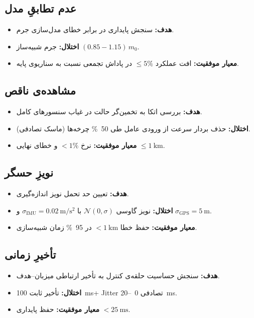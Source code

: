 	\subsection{
		عدم تطابقِ مدل}\label{subsec:scn_mismatch}
	\begin{itemize}
		\item \textbf{هدف:} سنجش پایداری در برابر خطای مدل‌سازی جرم.
		\item \textbf{اختلال:} جرم شبیه‌ساز $(0.85\!-\!1.15)\,m_0$.
		\item \textbf{معیار موفقیت:} افت عملکرد $\le5\%$ در پاداش تجمعی نسبت به سناریوی پایه.
	\end{itemize}
	
	\subsection{
		مشاهده‌ی ناقص}\label{subsec:scn_partial}
	\begin{itemize}
		\item \textbf{هدف:} بررسی اتکا به تخمین‌گر حالت در غیاب سنسورهای کامل.
		\item \textbf{اختلال:} حذف بردار سرعت از ورودی عامل طی \SI{50}{\percent} چرخه‌ها (ماسک تصادفی).
		\item \textbf{معیار موفقیت:} نرخ $<1\%$ و خطای نهایی $\le\SI{1}{\kilo\meter}$.
	\end{itemize}
	
	\subsection{نویزِ حسگر}\label{subsec:scn_noise}
	\begin{itemize}
		\item \textbf{هدف:} تعیین حد تحمل نویز اندازه‌گیری.
		\item \textbf{اختلال:} نویز گاوسی $\mathcal{N}(0,\sigma)$ با $\sigma_{\text{IMU}}=\SI{0.02}{\meter\per\second\squared}$ و $\sigma_{\text{GPS}}=\SI{5}{\meter}$.
		\item \textbf{معیار موفقیت:} حفظ خطا $<\SI{1}{\kilo\meter}$ در \SI{95}{\percent} زمان شبیه‌سازی.
	\end{itemize}
	
	\subsection{
		تأخیرِ زمانی}\label{subsec:scn_delay}
	\begin{itemize}
		\item \textbf{هدف:} سنجش حساسیت حلقه‌ی کنترل به تأخیر ارتباطی میزبان–هدف.
		\item \textbf{اختلال:} تأخیر ثابت \SI{100}{\milli\second}+ Jitter تصادفی \SI{0}{–}\SI{20}{\milli\second}.
		\item \textbf{معیار موفقیت:} حفظ پایداری  $<\SI{25}{\milli\second}$.
	\end{itemize}
	
